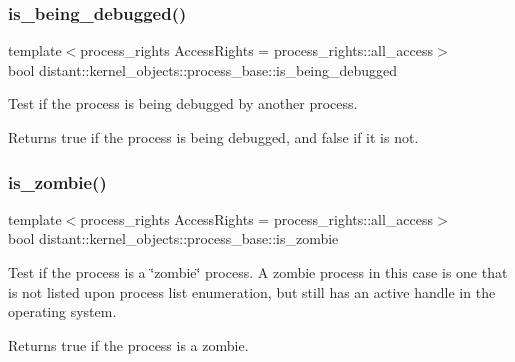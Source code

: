 \subsubsection{\texorpdfstring{is\+\_\+being\+\_\+debugged()}{is\_being\_debugged()}}
{\footnotesize\ttfamily template$<$process\+\_\+rights Access\+Rights = process\+\_\+rights\+::all\+\_\+access$>$ \\
bool distant\+::kernel\+\_\+objects\+::process\+\_\+base\+::is\+\_\+being\+\_\+debugged\hspace{0.3cm}{\ttfamily [inline]}}



Test if the process is being debugged by another process. 

\begin{DoxyReturn}{Returns}
true if the process is being debugged, and false if it is not. 
\end{DoxyReturn}
\mbox{\label{classdistant_1_1kernel__objects_1_1process_ab023cd4a4d27ccef7879d1a3c513148b}} 
\subsubsection{\texorpdfstring{is\+\_\+zombie()}{is\_zombie()}}
{\footnotesize\ttfamily template$<$process\+\_\+rights Access\+Rights = process\+\_\+rights\+::all\+\_\+access$>$ \\
bool distant\+::kernel\+\_\+objects\+::process\+\_\+base\+::is\+\_\+zombie\hspace{0.3cm}{\ttfamily [inline]}}



Test if the process is a \char`\"{}zombie\char`\"{} process. A zombie process in this case is one that is not listed upon process list enumeration, but still has an active handle in the operating system. 

\begin{DoxyReturn}{Returns}
true if the process is a zombie. 
\end{DoxyReturn}
\mbox{\label{classdistant_1_1kernel__objects_1_1process_a5740aade7f116777a17c84375b8643d2}} 
